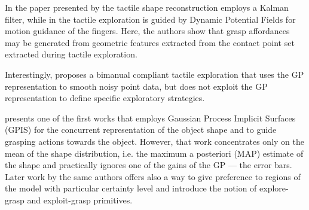 In the paper presented by \citet{Meier2011Probabilistic} the tactile shape reconstruction employs a Kalman filter, while in \citet{Bierbaum2008Potential} the tactile exploration is guided by Dynamic Potential Fields for motion guidance
of the fingers. Here, the authors show that grasp affordances may be generated from geometric features extracted from the contact point set extracted during tactile exploration.

Interestingly, \citet{Sommer2014Bimanual} proposes a bimanual compliant tactile exploration that uses the GP representation to smooth noisy point data, but does not exploit the GP representation to define specific exploratory strategies.

\cite{Dragiev2011Gaussian} presents one of the first works that employs Gaussian Process Implicit Surfaces (GPIS) for the concurrent representation of the object shape and to guide grasping actions towards the object. However, that work concentrates only on the mean of the shape distribution, i.e. the maximum a posteriori (MAP) estimate of the shape and practically ignores one of the gains of the GP --- the error bars.
Later work by the same authors \citep{Dragiev2013Uncertainty} offers also a way to give preference to regions of the model with particular certainty level and introduce the notion of explore-grasp and exploit-grasp primitives.

